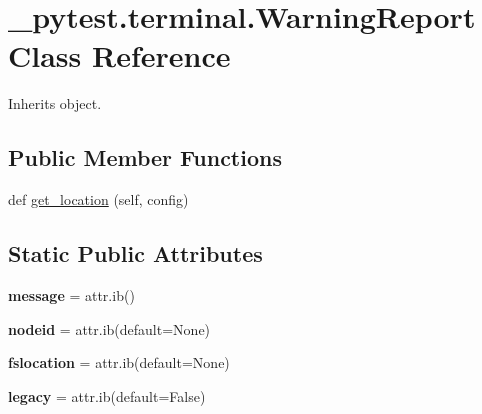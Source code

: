 \hypertarget{class__pytest_1_1terminal_1_1_warning_report}{}\section{\+\_\+pytest.\+terminal.\+Warning\+Report Class Reference}
\label{class__pytest_1_1terminal_1_1_warning_report}


Inherits object.

\subsection*{Public Member Functions}
\begin{DoxyCompactItemize}
\item 
def \hyperlink{class__pytest_1_1terminal_1_1_warning_report_a8ae5226649cc0aef231e6e61602a440c}{get\+\_\+location} (self, config)
\end{DoxyCompactItemize}
\subsection*{Static Public Attributes}
\begin{DoxyCompactItemize}
\item 
\mbox{\label{class__pytest_1_1terminal_1_1_warning_report_aa8246d2d6c1f62354a1ab4c41bc9eb56}} 
{\bfseries message} = attr.\+ib()
\item 
\mbox{\label{class__pytest_1_1terminal_1_1_warning_report_a413f1dc4fcd66e7eaf9506c230508632}} 
{\bfseries nodeid} = attr.\+ib(default=None)
\item 
\mbox{\label{class__pytest_1_1terminal_1_1_warning_report_a28445a21e91dcd873fe191ca48a29d40}} 
{\bfseries fslocation} = attr.\+ib(default=None)
\item 
\mbox{\label{class__pytest_1_1terminal_1_1_warning_report_a161ec17af7dc5d1b43749ac6d107a36a}} 
{\bfseries legacy} = attr.\+ib(default=False)
\end{DoxyCompactItemize}


